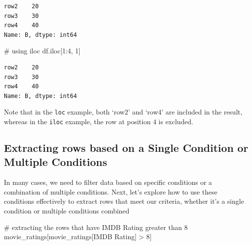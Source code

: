 \documentclass[
  letterpaper,
  DIV=11,
  numbers=noendperiod]{scrreprt}
\newenvironment{Shaded}{\begin{snugshade}}{\end{snugshade}}
\newcommand{\CommentTok}[1]{\textcolor[rgb]{0.37,0.37,0.37}{#1}}
\newcommand{\DecValTok}[1]{\textcolor[rgb]{0.68,0.00,0.00}{#1}}
\newcommand{\NormalTok}[1]{\textcolor[rgb]{0.00,0.23,0.31}{#1}}
\newcommand{\OperatorTok}[1]{\textcolor[rgb]{0.37,0.37,0.37}{#1}}
\newcommand{\StringTok}[1]{\textcolor[rgb]{0.13,0.47,0.30}{#1}}
\begin{document}
\begin{verbatim}
row2    20
row3    30
row4    40
Name: B, dtype: int64
\end{verbatim}

\begin{Shaded}
\begin{Highlighting}[]

\CommentTok{\# using \textquotesingle{}iloc\textquotesingle{}}
\NormalTok{df.iloc[}\DecValTok{1}\NormalTok{:}\DecValTok{4}\NormalTok{, }\DecValTok{1}\NormalTok{]}
\end{Highlighting}
\end{Shaded}

\begin{verbatim}
row2    20
row3    30
row4    40
Name: B, dtype: int64
\end{verbatim}

Note that in the \texttt{loc} example, both `row2' and `row4' are
included in the result, whereas in the \texttt{iloc} example, the row at
position 4 is excluded.

\hypertarget{extracting-rows-based-on-a-single-condition-or-multiple-conditions}{%
\subsection{Extracting rows based on a Single Condition or Multiple
Conditions}\label{extracting-rows-based-on-a-single-condition-or-multiple-conditions}}

In many cases, we need to filter data based on specific conditions or a
combination of multiple conditions. Next, let's explore how to use these
conditions effectively to extract rows that meet our criteria, whether
it's a single condition or multiple conditions combined

\begin{Shaded}
\begin{Highlighting}[]
\CommentTok{\# extracting the rows that have IMDB Rating greater than 8}
\NormalTok{movie\_ratings[movie\_ratings[}\StringTok{\textquotesingle{}IMDB Rating\textquotesingle{}}\NormalTok{] }\OperatorTok{\textgreater{}} \DecValTok{8}\NormalTok{]}
\end{Highlighting}
\end{Shaded}
\end{document}
